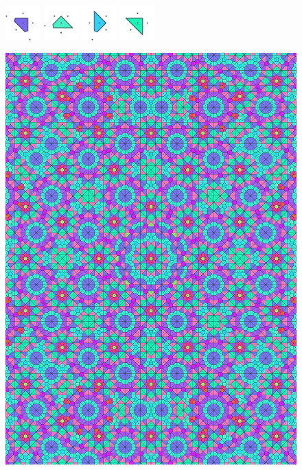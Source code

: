 \documentclass[text.tex]{subfiles}
\begin{document}
\begin{figure}[h!]
\includegraphics[width=0.12\textwidth]{img/results/octagon/octagon_109619_(-27_13alpha_4)_014.pdf}
\includegraphics[width=0.12\textwidth]{img/results/octagon/octagon_109619_(-27_13alpha_4)_015.pdf}
\includegraphics[width=0.12\textwidth]{img/results/octagon/octagon_109619_(-27_13alpha_4)_016.pdf}
\includegraphics[width=0.12\textwidth]{img/results/octagon/octagon_109619_(-27_13alpha_4)_017.pdf}
\end{figure}

\begin{figure}[h!]
\centering
\includegraphics[width=1\textwidth]{img/results/octagon/quasi_polygon-octagon_109619_(-27_13alpha_4).pdf}
\end{figure}
\end{document}
